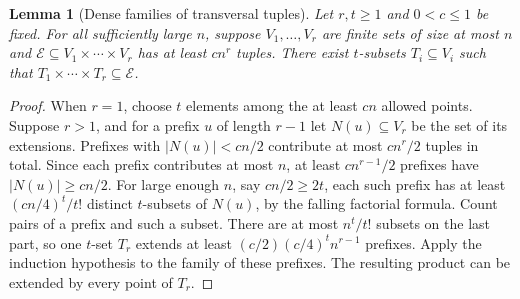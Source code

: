 \documentclass[11pt,oneside,openany]{book}
\theoremstyle{plain}
\newtheorem{lemma}[theorem]{Lemma}
\theoremstyle{definition}
\theoremstyle{remark}
\begin{document}
\begin{lemma}[Dense families of transversal tuples]\label{p205:transversal-density}
Let \(r,t\ge1\) and \(0<c\le1\) be fixed. For all sufficiently large
\(n\), suppose \(V_1,\dots,V_r\) are finite sets of size at most \(n\)
and \(\mathcal E\subseteq V_1\times\cdots\times V_r\) has at least
\(cn^r\) tuples. There exist \(t\)-subsets \(T_i\subseteq V_i\)
such that \(T_1\times\cdots\times T_r\subseteq\mathcal E\).
\end{lemma}
\begin{proof}
When \(r=1\), choose \(t\) elements among the at least \(cn\) allowed
points. Suppose \(r>1\), and for a prefix \(u\) of length \(r-1\)
let \(N(u)\subseteq V_r\) be the set of its extensions. Prefixes with
\(|N(u)|<cn/2\) contribute at most \(cn^r/2\) tuples in total. Since
each prefix contributes at most \(n\), at least \(cn^{r-1}/2\)
prefixes have \(|N(u)|\ge cn/2\). For large enough \(n\), say \(cn/2\ge2t\),
each such prefix has at least \((cn/4)^t/t!\) distinct \(t\)-subsets
of \(N(u)\), by the falling factorial formula. Count pairs of a
prefix and such a subset. There are at most \(n^t/t!\) subsets on
the last part, so one \(t\)-set \(T_r\) extends at least
\((c/2)(c/4)^t n^{r-1}\) prefixes. Apply the induction hypothesis
to the family of these prefixes. The resulting product can be
extended by every point of \(T_r\).
\end{proof}
\end{document}
